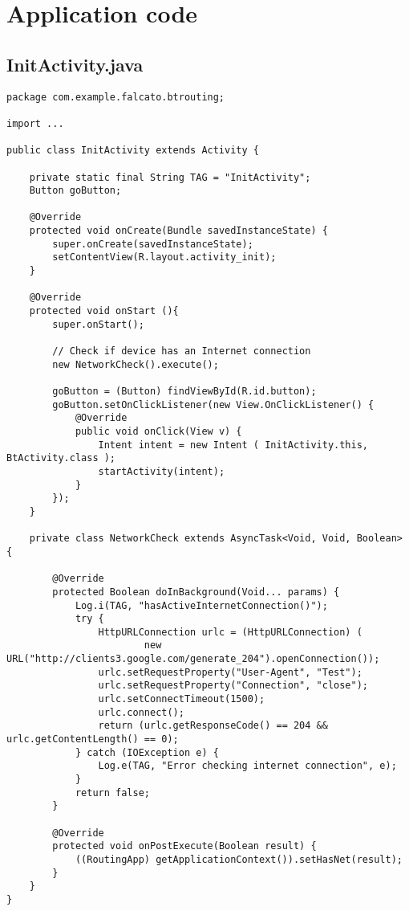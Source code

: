 
\chapter{Application code}
\section{InitActivity.java}
\label{appendix:initActivity}

\begin{verbatim}
package com.example.falcato.btrouting;

import ...

public class InitActivity extends Activity {

    private static final String TAG = "InitActivity";
    Button goButton;

    @Override
    protected void onCreate(Bundle savedInstanceState) {
        super.onCreate(savedInstanceState);
        setContentView(R.layout.activity_init);
    }

    @Override
    protected void onStart (){
        super.onStart();

        // Check if device has an Internet connection
        new NetworkCheck().execute();

        goButton = (Button) findViewById(R.id.button);
        goButton.setOnClickListener(new View.OnClickListener() {
            @Override
            public void onClick(View v) {
                Intent intent = new Intent ( InitActivity.this, BtActivity.class );
                startActivity(intent);
            }
        });
    }

    private class NetworkCheck extends AsyncTask<Void, Void, Boolean> {

        @Override
        protected Boolean doInBackground(Void... params) {
            Log.i(TAG, "hasActiveInternetConnection()");
            try {
                HttpURLConnection urlc = (HttpURLConnection) (
                        new URL("http://clients3.google.com/generate_204").openConnection());
                urlc.setRequestProperty("User-Agent", "Test");
                urlc.setRequestProperty("Connection", "close");
                urlc.setConnectTimeout(1500);
                urlc.connect();
                return (urlc.getResponseCode() == 204 && urlc.getContentLength() == 0);
            } catch (IOException e) {
                Log.e(TAG, "Error checking internet connection", e);
            }
            return false;
        }

        @Override
        protected void onPostExecute(Boolean result) {
            ((RoutingApp) getApplicationContext()).setHasNet(result);
        }
    }
}

\end{verbatim}

